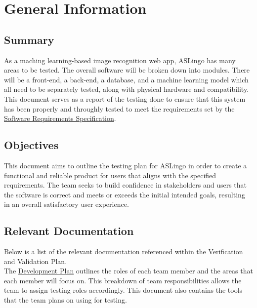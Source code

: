 \documentclass[12pt, titlepage]{article}
\begin{document}
\listoftables %

\listoffigures %

\newpage


\section{General Information}

\subsection{Summary}

As a maching learning-based image recognition web app, ASLingo has many areas to be tested. The overall software will be broken down into modules. There will be a front-end, a back-end, a database, and a machine learning model which all need to be separately tested, along with physical hardware and compatibility. This document serves as a report of the testing done to ensure that this system has been properly and throughly tested to meet the requirements set by the \href{https://github.com/stanreee/sign-language-learning/blob/main/docs/SRS/SRS.pdf}{Software Requirements Specification}.  

\subsection{Objectives}

This document aims to outline the testing plan for ASLingo in order to create a functional and reliable product for users that aligns with the specified requirements. The team seeks to build confidence in stakeholders and users that the software is correct and meets or exceeds the initial intended goals, resulting in an overall satisfactory user experience.

\subsection{Relevant Documentation} 

Below is a list of the relevant documentation referenced within the Verification and Validation Plan.\\

\noindent The \href{https://github.com/stanreee/sign-language-learning/blob/main/docs/DevelopmentPlan/DevelopmentPlan.pdf}{Development Plan} outlines the roles of each team member and the areas that each member will focus on. This breakdown of team responsibilities allows the team to assign testing roles accordingly. This document also contains the tools that the team plans on using for testing.\\
\end{document}
